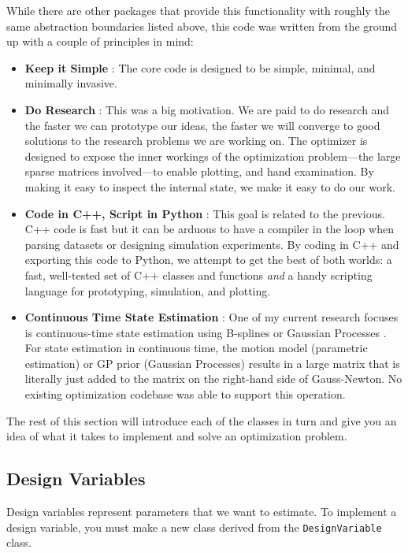 \documentclass[11pt,a4,oneside]{article}
\newcommand{\txt}[1]{{\footnotesize\texttt{#1}}}
\newcommand{\listcpp}[2]{}
\begin{document}
While there are other packages that provide this functionality with roughly the same abstraction boundaries listed above, this code was written from the ground up with a couple of principles in mind:
\begin{itemize}
\item {\bf Keep it Simple} : The core code is designed to be simple, minimal, and minimally invasive.
\item {\bf Do Research} : This was a big motivation. We are paid to do research and the faster we can prototype our ideas, the faster we will converge to good solutions to the research problems we are working on. The optimizer is designed to expose the inner workings of the optimization problem---the large sparse matrices involved---to enable plotting, and hand examination. By making it easy to inspect the internal state, we make it easy to do our work.
\item {\bf Code in C++, Script in Python} : This goal is related to the previous. C++ code is fast but it can be arduous to have a compiler in the loop when parsing datasets or designing simulation experiments. By coding in C++ and exporting this code to Python, we attempt to get the best of both worlds: a fast, well-tested set of C++ classes and functions {\em and} a handy scripting language for prototyping, simulation, and plotting.
\item {\bf Continuous Time State Estimation} : One of my current research focuses is continuous-time state estimation using B-splines or Gaussian Processes \citep{Furgale1200,Tong1200}. For state estimation in continuous time, the motion model (parametric estimation) or GP prior (Gaussian Processes) results in a large matrix that is literally just added to the matrix on the right-hand side of Gauss-Newton. No existing optimization codebase was able to support this operation.
\end{itemize}

The rest of this section will introduce each of the classes in turn and give you an idea of what it takes to implement and solve an optimization problem.
\subsection{Design Variables \label{ss:DesignVariable}}
Design variables represent parameters that we want to estimate. To implement a design variable, you must make a new class derived from the \txt{DesignVariable} class.

\listcpp{DesignVariable.hpp}{../../aslam_backend/include/aslam/backend/DesignVariable.hpp}
\end{document}
